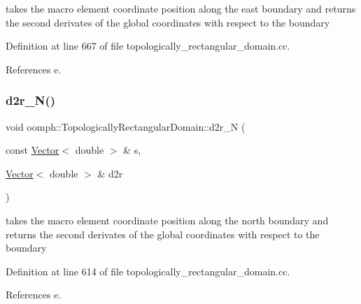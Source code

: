 takes the macro element coordinate position along the east boundary and returns the second derivates of the global coordinates with respect to the boundary 



Definition at line 667 of file topologically\+\_\+rectangular\+\_\+domain.\+cc.



References e.

\mbox{\label{classoomph_1_1TopologicallyRectangularDomain_a6cc86191b0085c8d7b3f05985cf647c8}} 
\subsubsection{\texorpdfstring{d2r\+\_\+\+N()}{d2r\_N()}}
{\footnotesize\ttfamily void oomph\+::\+Topologically\+Rectangular\+Domain\+::d2r\+\_\+N (\begin{DoxyParamCaption}\item[{const \hyperlink{classoomph_1_1Vector}{Vector}$<$ double $>$ \&}]{s,  }\item[{\hyperlink{classoomph_1_1Vector}{Vector}$<$ double $>$ \&}]{d2r }\end{DoxyParamCaption})\hspace{0.3cm}{\ttfamily [private]}}



takes the macro element coordinate position along the north boundary and returns the second derivates of the global coordinates with respect to the boundary 



Definition at line 614 of file topologically\+\_\+rectangular\+\_\+domain.\+cc.



References e.

\mbox{\label{classoomph_1_1TopologicallyRectangularDomain_ae3bc22aeb952c657f3b3672068243197}} 
